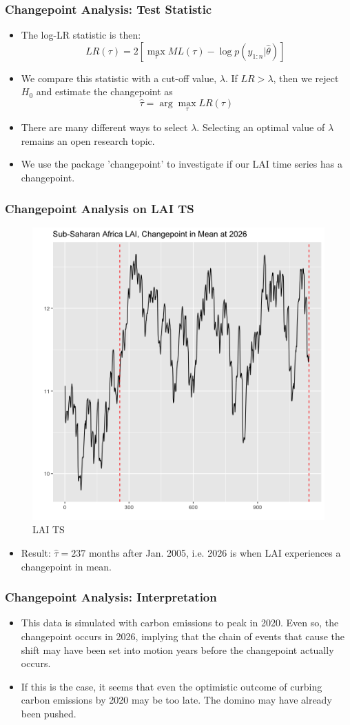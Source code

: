 \documentclass{beamer}
\begin{document}
\begin{frame}
	\frametitle{Changepoint Analysis: Test Statistic}
	\begin{itemize}
		\item The log-LR statistic is then: 
		\begin{equation*}
		LR(\tau)=2\left[\max_\tau ML(\tau)-\log p(y_{1:n}|\hat{\theta})\right]\
		\end{equation*}
		\item We compare this statistic with a cut-off value, $\lambda$. If $LR>\lambda$, then we reject $H_0$ and estimate the changepoint as 
		\begin{equation*}
		\hat{\tau}=\arg\max_\tau LR(\tau)
		\end{equation*}
		\item There are many different ways to select $\lambda$. Selecting an optimal value of $\lambda$ remains an open research topic.
		\item We use the package 'changepoint'
		to investigate if our LAI time series has a changepoint.
	\end{itemize}
\end{frame}

\begin{frame}
	\frametitle{Changepoint Analysis on LAI TS}
	\begin{figure}
	\centering
	\includegraphics[width=0.55\linewidth]{../img/changepoint_LAI.png}
	\caption{LAI TS}
	\end{figure}
	\begin{itemize}
		\item Result: $\hat{\tau}= 237$ months after Jan. 2005, i.e. 2026 is when LAI experiences a changepoint in mean.
	\end{itemize}
\end{frame}

\begin{frame}
	\frametitle{Changepoint Analysis: Interpretation}
	\begin{itemize}
		\item This data is simulated with carbon emissions to peak in 2020. Even so, the changepoint occurs in 2026, implying that the chain of events that cause the shift may have been set into motion years before the changepoint actually occurs.
		\item If this is the case, it seems that even the optimistic outcome of curbing carbon emissions by 2020 may be too late. The domino may have already been pushed.
	\end{itemize}
\end{frame}
\end{document}
